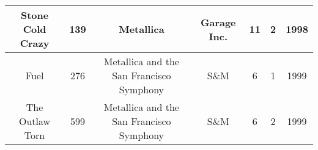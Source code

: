 \documentclass[article,a4paper,firamath,12pt]{nsi}
\begin{document}
\begin{center}
\begin{tabular}{|c|c|c|c|c|c|c|}
        \hline
        Stone Cold Crazy                                  & 139                         & Metallica                                & Garage Inc.                 & 11                          & 2                        & 1998                        \\
        \hline
        Fuel                                              & 276                         & Metallica and the San Francisco Symphony & S\&M                        & 6                           & 1                        & 1999                        \\
        \hline
        The Outlaw Torn                                   & 599                         & Metallica and the San Francisco Symphony & S\&M                        & 6                           & 2                        & 1999                        \\
        \hline
    \end{tabular}



\end{center}
\end{document}
